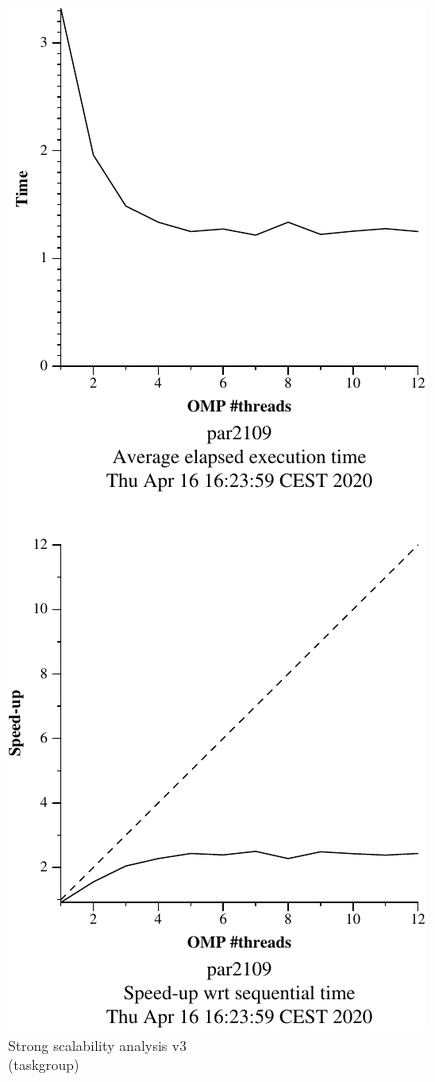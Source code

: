 \begin{figure}[H]
    \begin{minipage}{0.5\textwidth}
        \centering
        \includegraphics[width=0.7\linewidth]{plots/v3-crop.pdf}
        \caption{Strong scalability analysis v3 \\ (taskgroup)}
        \label{fig:ssa_v3} 
    \end{minipage}
    \begin{minipage}{0.5\textwidth}
        \centering

\end{minipage}
\end{figure}
